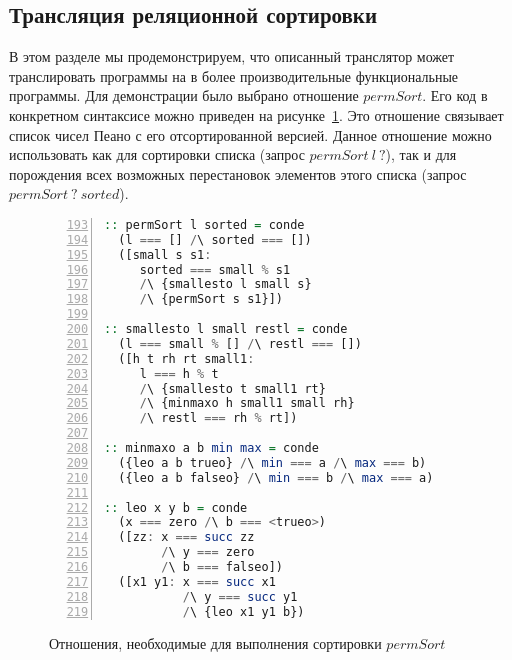\subsection{Трансляция реляционной сортировки}
\label{lab:sort}

В этом разделе мы продемонстрируем, что описанный транслятор может транслировать программы на \miniKanren{} в более производительные функциональные программы.
Для демонстрации было выбрано отношение $permSort$.
Его код в конкретном синтаксисе \miniKanren{} можно приведен на рисунке~\ref{lst:sort}.
Это отношение связывает список чисел Пеано с его отсортированной версией.
Данное отношение можно использовать как для сортировки списка (запрос $permSort \ l \ ?$), так и для порождения всех возможных перестановок элементов этого списка (запрос $permSort \ ? \ sorted$).

\begin{figure}[h!]
  \begin{center}
  \begin{minipage}{0.95\textwidth}
  \begin{lstlisting}[language=Haskell, frame=single, numbers=left,numberstyle=\small, firstnumber=193, escapechar=|]
:: permSort l sorted = conde
  (l === [] /\ sorted === [])
  ([small s s1:
     sorted === small % s1
     /\ {smallesto l small s}
     /\ {permSort s s1}])

:: smallesto l small restl = conde
  (l === small % [] /\ restl === [])
  ([h t rh rt small1:
     l === h % t
     /\ {smallesto t small1 rt}
     /\ {minmaxo h small1 small rh}
     /\ restl === rh % rt])

:: minmaxo a b min max = conde
  ({leo a b trueo} /\ min === a /\ max === b)
  ({leo a b falseo} /\ min === b /\ max === a)

:: leo x y b = conde
  (x === zero /\ b === <trueo>)
  ([zz: x === succ zz
        /\ y === zero
        /\ b === falseo])
  ([x1 y1: x === succ x1
           /\ y === succ y1
           /\ {leo x1 y1 b})
  \end{lstlisting}
  \end{minipage}
  \end{center}
  \caption{Отношения, необходимые для выполнения сортировки $permSort$}
  \label{lst:sort}
\end{figure}

